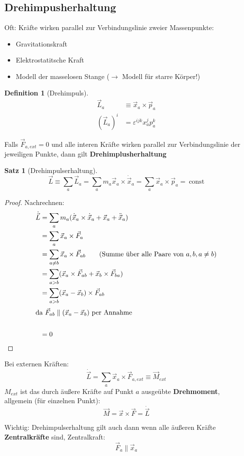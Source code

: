 \documentclass[a4paper]{scrartcl}
\renewcommand{\v}[1]{\vec{#1}}
\theoremstyle{definition}
\newtheorem{defn}{Definition}
\theoremstyle{plain}
\newtheorem{thm}{Satz}
\theoremstyle{remark}
\begin{document}
\subsection{Drehimpusherhaltung}
\label{sec-4-2}
Oft: Kräfte wirken parallel zur Verbindungslinie zweier Massenpunkte:
\begin{itemize}
\item Gravitationskraft
\item Elektrostatitsche Kraft
\item Modell der masselosen Stange ($\rightarrow$ Modell für starre Körper!)
\end{itemize}
\begin{defn}[Drehimpuls]
\begin{align*}
\v L_a &\equiv \v x_a \times \v p_a \\
(\v L_a)^i &= \varepsilon^{ijk}x_a^j p_a^k
\end{align*}
\end{defn}
Falls $\v F_{a,ext} = 0$ und alle interen Kräfte wirken parallel zur Verbindungslinie der jeweiligen Punkte, dann gilt \textbf{Drehimplusherhaltung}
\begin{thm}[Drehimpulserhaltung]
\[\v L \equiv \sum_a \v L_a = \sum_a m_a \v x_a \times \dot{\v x}_a = \sum_a \v x_a \times \v p_a = ~\text{const}\]
\end{thm}
\begin{proof}
Nachrechnen:
\begin{align*}
\dot{\v L} &= \sum_a m_a (\dot{\v x}_a \times \dot{\v x}_a + \v x_a + \ddot{\v x}_a) \\
&= \sum_a \v x_a \times \v F_a \\
&= \sum_{a\neq b} \v x_a \times \v F_{ab} \tag{Summe über alle Paare von $a,b, a\neq b$} \\
&= \sum_{a > b}(\v x_a \times \v F_{ab} + \v x_b \times \v F_{ba}) \\
&= \sum_{a > b} (\v x_a - \v x_b)\times \v F_{ab} \\
\intertext{da $\v F_{ab} \parallel (\v x_a - \v x_b)$ per Annahme} \\
&= 0 \tag*{\qedhere}
\end{align*}
\end{proof}
Bei externen Kräften:
\[\dot{\v L} = \sum_a \v x_a \times \v F_{a,ext} \equiv \v M_{ext}\]
$M_{ext}$ ist das durch äußere Kräfte auf Punkt $a$ ausgeübte \textbf{Drehmoment}, allgemein (für einzelnen Punkt):
\[\v M = \v x \times \v F = \dot{\v L}\]

Wichtig: Drehimpulserhaltung gilt auch dann wenn alle äußeren Kräfte \textbf{Zentralkräfte} sind, Zentralkraft:
\[\v F_a \parallel \v x_a\]
\end{document}
